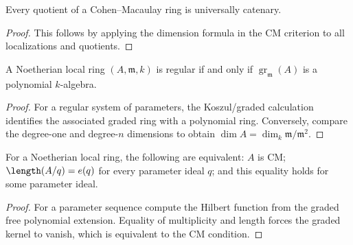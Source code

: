 \begin{theorem}\label{mcrt-thm-17-9}
Every quotient of a Cohen--Macaulay ring is universally catenary.
\end{theorem}
\begin{proof}
This follows by applying the dimension formula in the CM criterion to all
localizations and quotients.
\end{proof}

\begin{theorem}\label{mcrt-thm-17-10}
A Noetherian local ring $(A,\mathfrak m,k)$ is regular if and only if
$\operatorname{gr}_{\mathfrak m}(A)$ is a polynomial $k$-algebra.
\end{theorem}
\begin{proof}
For a regular system of parameters, the Koszul/graded calculation identifies
the associated graded ring with a polynomial ring.  Conversely, compare the
degree-one and degree-$n$ dimensions to obtain
$\dim A=\dim_k\mathfrak m/\mathfrak m^2$.
\end{proof}

\begin{theorem}\label{mcrt-thm-17-11}
For a Noetherian local ring, the following are equivalent: $A$ is CM;
$\length(A/q)=e(q)$ for every parameter ideal $q$; and this equality holds for
some parameter ideal.
\end{theorem}
\begin{proof}
For a parameter sequence compute the Hilbert function from the graded free
polynomial extension.  Equality of multiplicity and length forces the graded
kernel to vanish, which is equivalent to the CM condition.
\end{proof}

